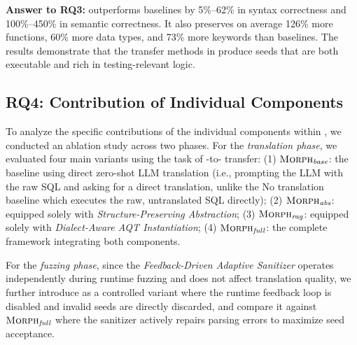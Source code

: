 \documentclass[conference]{IEEEtran}
\begin{document}
\begin{answerbox}
\textbf{Answer to RQ3:} 
\tool{} outperforms baselines by 5\%--62\% in syntax correctness and 100\%--450\% in semantic correctness.
It also preserves on average 126\% more functions, 60\% more data types, and 73\% more keywords than baselines.
The results demonstrate that the transfer methods in \tool{} produce seeds that are both executable and rich in testing-relevant logic.
\end{answerbox}

\subsection{RQ4: Contribution of Individual Components}
To analyze the specific contributions of the individual components within \tool{}, we conducted an ablation study across two phases. 
For the \textit{translation phase}, we evaluated four main variants using the task of  \pg{}-to-\duckdb{} transfer:
(1) $\textsc{Morph}{}_{\textit{base}}$: the baseline using direct zero-shot LLM translation (i.e., prompting the LLM with the raw SQL and asking for a direct translation, unlike the No translation baseline which executes the raw, untranslated SQL directly);
(2) $\textsc{Morph}{}_{\textit{abs}}$: equipped solely with \textit{Structure-Preserving Abstraction};
(3) $\textsc{Morph}{}_{\textit{rag}}$: equipped solely with \textit{Dialect-Aware AQT Instantiation};
(4) $\textsc{Morph}{}_{\textit{full}}$: the complete framework integrating both components.

For the \textit{fuzzing phase}, since the \textit{Feedback-Driven Adaptive Sanitizer} operates independently during runtime fuzzing and does not affect translation quality, we further introduce \tooldisfuzzer{} as a controlled variant where the runtime feedback loop is disabled and invalid seeds are directly discarded, and compare it against $\textsc{Morph}{}_{\textit{full}}$ where the sanitizer actively repairs parsing errors to maximize seed acceptance.
\end{document}
